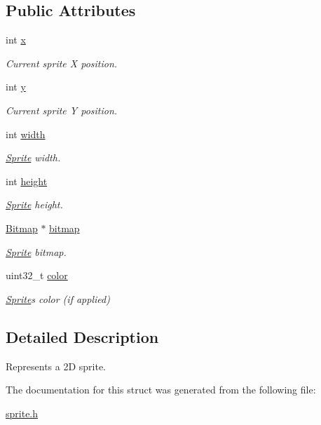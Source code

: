 \subsection*{Public Attributes}
\begin{DoxyCompactItemize}
\item 
int \mbox{\hyperlink{group__sprite_gab36028dcefdd4bf024c52c8d9519a283}{x}}
\begin{DoxyCompactList}\small\item\em Current sprite X position. \end{DoxyCompactList}\item 
int \mbox{\hyperlink{group__sprite_ga363e26017ee2aaed8636f7dab92af2cd}{y}}
\begin{DoxyCompactList}\small\item\em Current sprite Y position. \end{DoxyCompactList}\item 
int \mbox{\hyperlink{group__sprite_ga0a3364944c5e361fc9e7ae406224d682}{width}}
\begin{DoxyCompactList}\small\item\em \mbox{\hyperlink{struct_sprite}{Sprite}} width. \end{DoxyCompactList}\item 
int \mbox{\hyperlink{group__sprite_ga1f07c8f2080c193759aec0e13503d7ab}{height}}
\begin{DoxyCompactList}\small\item\em \mbox{\hyperlink{struct_sprite}{Sprite}} height. \end{DoxyCompactList}\item 
\mbox{\hyperlink{struct_bitmap}{Bitmap}} $\ast$ \mbox{\hyperlink{group__sprite_ga626b702203ed42c3cd2af8f159eced42}{bitmap}}
\begin{DoxyCompactList}\small\item\em \mbox{\hyperlink{struct_sprite}{Sprite}} bitmap. \end{DoxyCompactList}\item 
uint32\+\_\+t \mbox{\hyperlink{group__sprite_ga925050b598e308e3da33683aa2cb2aa7}{color}}
\begin{DoxyCompactList}\small\item\em \mbox{\hyperlink{struct_sprite}{Sprite}}\textquotesingle{}s color (if applied) \end{DoxyCompactList}\end{DoxyCompactItemize}


\subsection{Detailed Description}
Represents a 2D sprite. 

The documentation for this struct was generated from the following file\+:\begin{DoxyCompactItemize}
\item 
\mbox{\hyperlink{sprite_8h}{sprite.\+h}}\end{DoxyCompactItemize}
